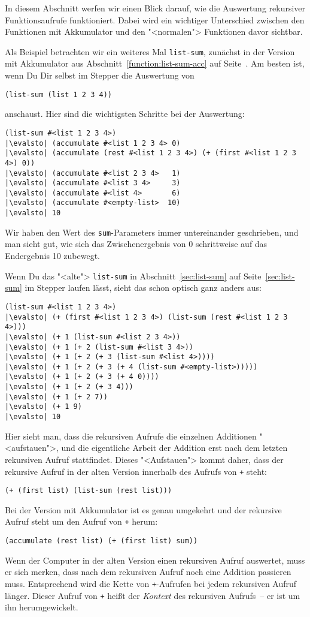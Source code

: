 In diesem Abschnitt werfen wir einen Blick darauf, wie  
die Auswertung rekursiver Funktionsaufrufe funktioniert.  Dabei
wird ein wichtiger Unterschied zwischen den Funktionen mit Akkumulator
und den "<normalen"> Funktionen davor sichtbar.

Als Beispiel betrachten wir ein weiteres Mal \lstinline{list-sum},
zunächst in der Version mit Akkumulator aus
Abschnitt~\ref{function:list-sum-acc} auf
Seite~\pageref{function:list-sum-acc}.  Am besten ist, wenn Du Dir
selbst im Stepper die Auswertung von
\begin{lstlisting}
(list-sum (list 1 2 3 4))
\end{lstlisting}
%
anschaust.  Hier sind die wichtigsten Schritte bei der Auswertung:
%
\begin{lstlisting}
(list-sum #<list 1 2 3 4>)
|\evalsto| (accumulate #<list 1 2 3 4> 0)
|\evalsto| (accumulate (rest #<list 1 2 3 4>) (+ (first #<list 1 2 3 4>) 0))
|\evalsto| (accumulate #<list 2 3 4>   1)
|\evalsto| (accumulate #<list 3 4>     3)
|\evalsto| (accumulate #<list 4>       6)
|\evalsto| (accumulate #<empty-list>  10)
|\evalsto| 10
\end{lstlisting}
%
Wir haben den Wert des \lstinline{sum}-Parameters immer untereinander
geschrieben, und man sieht gut, wie sich das Zwischenergebnis von 0
schrittweise auf das Endergebnis 10 zubewegt.

Wenn Du das "<alte"> \lstinline{list-sum} in
Abschnitt~\ref{sec:list-sum} auf Seite~\ref{sec:list-sum} im Stepper
laufen lässt, sieht das schon optisch ganz anders aus:
%
\begin{lstlisting}
(list-sum #<list 1 2 3 4>)
|\evalsto| (+ (first #<list 1 2 3 4>) (list-sum (rest #<list 1 2 3 4>)))
|\evalsto| (+ 1 (list-sum #<list 2 3 4>))
|\evalsto| (+ 1 (+ 2 (list-sum #<list 3 4>))
|\evalsto| (+ 1 (+ 2 (+ 3 (list-sum #<list 4>))))
|\evalsto| (+ 1 (+ 2 (+ 3 (+ 4 (list-sum #<empty-list>)))))
|\evalsto| (+ 1 (+ 2 (+ 3 (+ 4 0))))
|\evalsto| (+ 1 (+ 2 (+ 3 4)))
|\evalsto| (+ 1 (+ 2 7))
|\evalsto| (+ 1 9)
|\evalsto| 10
\end{lstlisting}
%
Hier sieht man, dass die rekursiven Aufrufe die einzelnen Additionen
"<aufstauen">, und die eigentliche Arbeit der Addition erst nach dem
letzten rekursiven Aufruf stattfindet.  Dieses "<Aufstauen"> kommt
daher, dass der rekursive Aufruf in der alten Version innerhalb des
Aufrufs von \lstinline{+} steht:
%
\begin{lstlisting}
(+ (first list) (list-sum (rest list)))
\end{lstlisting}
%
Bei der Version mit Akkumulator ist es genau umgekehrt und der
rekursive Aufruf steht um den Aufruf von \lstinline{+} herum:
%
\begin{lstlisting}
(accumulate (rest list) (+ (first list) sum))
\end{lstlisting}
%
Wenn der Computer in der alten Version einen rekursiven Aufruf
auswertet, muss er sich merken, dass nach dem rekursiven Aufruf noch
eine Addition passieren muss.  Entsprechend wird die Kette von
\lstinline{+}-Aufrufen bei jedem rekursiven Aufruf länger.  Dieser
Aufruf von \lstinline{+} heißt der \textit{Kontext} des
rekursiven Aufrufs~-- er ist um ihn herumgewickelt.


